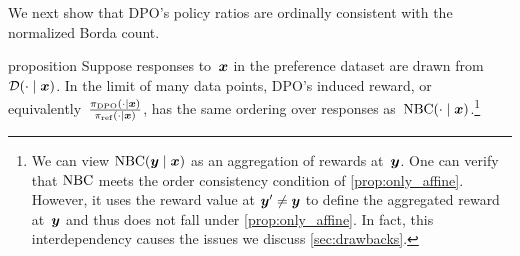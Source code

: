 We next show that DPO's policy ratios are ordinally consistent with the normalized Borda count.
\begin{theoremEnd}[restate]{proposition}
\label{prop:dpo_heter_sol}
Suppose responses to~${\bm{x}}$ in the preference dataset are drawn from ${\mathcal{D}}(\cdot \mid {\bm{x}})$. In the limit of many data points, DPO's induced reward, or equivalently~$\frac{\pi_{\rm DPO}(\cdot \mid {\bm{x}})}{\pi_{\rm ref}(\cdot \mid {\bm{x}})}$, has the same ordering over responses as~${\rm NBC}(\cdot \mid {\bm{x}})$.\footnote{We can view ${\rm NBC}({\bm{y}} \mid {\bm{x}})$ as an aggregation of rewards at~${\bm{y}}$. One can verify that ${\rm NBC}$ meets the order consistency condition of \cref{prop:only_affine}. However, it uses the reward value at ${\bm{y}}' \neq {\bm{y}}$ to define the aggregated reward at~${\bm{y}}$ and thus does not fall under \cref{prop:only_affine}. In fact, this interdependency causes the issues we discuss \cref{sec:drawbacks}.}
\end{theoremEnd}
